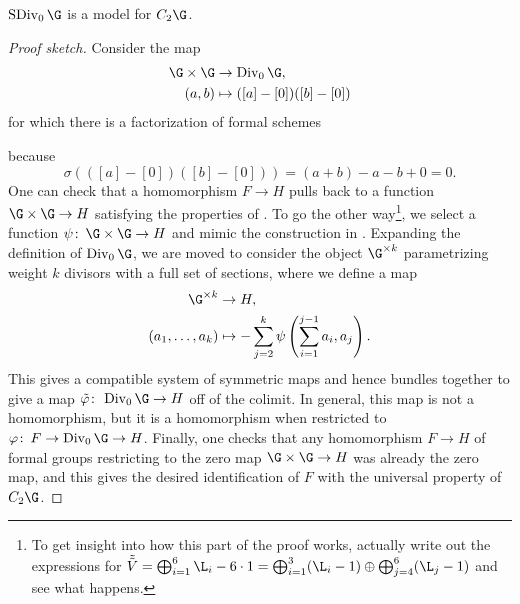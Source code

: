 \begin{theorem}\label{SDivModelsC2}
$\SDiv_0 \G$ is a model for $C_2 \G$.
\end{theorem}
\begin{proof}[Proof sketch]
Consider the map
\begin{align*}
\G \times \G & \to \Div_0 \G, \\
(a, b) & \mapsto ([a] - [0])([b] - [0])
\end{align*}
for which there is a factorization of formal schemes
\begin{center}
\end{center}
because \[\sigma(([a] - [0])([b] - [0])) = (a + b) - a - b + 0 = 0.\]  One can check that a homomorphism $F \to H$ pulls back to a function $\G \times \G \to H$ satisfying the properties of .  To go the other way\footnote{To get insight into how this part of the proof works, actually write out the expressions for $\tilde{\tilde{V}} = \bigoplus_{i=1}^6 \L_i - 6 \cdot 1 = \bigoplus_{i=1}^3 (\L_i - 1) \oplus \bigoplus_{j=4}^6 (\L_j - 1)$ and see what happens.}, we select a function $\psi\co \G \times \G \to H$ and mimic the construction in .  Expanding the definition of $\Div_0 \G$, we are moved to consider the object $\G^{\times k}$ parametrizing weight $k$ divisors with a full set of sections, where we define a map
\begin{align*}
\G^{\times k} & \to H, \\
(a_1, \ldots, a_k) & \mapsto -\sum_{j=2}^k \psi\left(\sum_{i=1}^{j-1} a_i, a_j \right).
\end{align*}
This gives a compatible system of symmetric maps and hence bundles together to give a map $\tilde\phi\co\Div_0 \G \to H$ off of the colimit.  In general, this map is not a homomorphism, but it is a homomorphism when restricted to $\phi\co F \to \Div_0 \G \to H$.  Finally, one checks that any homomorphism $F \to H$ of formal groups restricting to the zero map $\G \times \G \to H$ was already the zero map, and this gives the desired identification of $F$ with the universal property of $C_2 \G$.
\end{proof}

